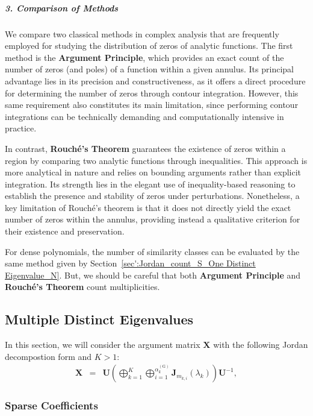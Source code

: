 \documentclass[11pt]{article}
\begin{document}
\subparagraph{3. Comparison of Methods}

We compare two classical methods in complex analysis that are frequently employed for studying the distribution of zeros of analytic functions. The first method is the \textbf{Argument Principle}, which provides an exact count of the number of zeros (and poles) of a function within a given annulus. Its principal advantage lies in its precision and constructiveness, as it offers a direct procedure for determining the number of zeros through contour integration. However, this same requirement also constitutes its main limitation, since performing contour integrations can be technically demanding and computationally intensive in practice.

In contrast, \textbf{Rouché's Theorem} guarantees the existence of zeros within a region by comparing two analytic functions through inequalities. This approach is more analytical in nature and relies on bounding arguments rather than explicit integration. Its strength lies in the elegant use of inequality-based reasoning to establish the presence and stability of zeros under perturbations. Nonetheless, a key limitation of Rouché’s theorem is that it does not directly yield the exact number of zeros within the annulus, providing instead a qualitative criterion for their existence and preservation.

For dense polynomials, the number of similarity classes can be evaluated by the same method given by Section~\ref{sec':Jordan_count_S_One Distinct Eigenvalue_N}. But, we should be careful that both \textbf{Argument Principle} and \textbf{Rouché's Theorem} count multiplicities.   

\subsection{Multiple Distinct Eigenvalues}\label{sec':Multiple Distinct Eigenvalues_N}

In this section, we will consider the argument matrix $\bm{X}$ with the following Jordan decompostion form and $K>1$:
%
\begin{eqnarray}\label{eq1: Multiple Distinct Eigenvalues_N}
\bm{X}&=& \bm{U}\left(\bigoplus\limits_{k=1}^{K}\bigoplus\limits_{i=1}^{\alpha_{k}^{(\mathrm{G})}}\bm{J}_{m_{k,i}}(\lambda_{k})\right)\bm{U}^{-1},
\end{eqnarray}


\subsubsection{Sparse Coefficients}\label{sec':S_Multiple Distinct Eigenvalue_N}
\end{document}

